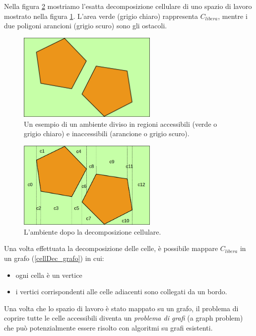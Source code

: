 \documentclass[8pt]{book}
\begin{document}
Nella figura \ref{cellDec_siDec} mostriamo l'esatta decomposizione cellulare di uno spazio di lavoro mostrato nella figura \ref{cellDec_nonDec}. L'area verde (grigio chiaro) rappresenta $C_{libera}$, mentre i due poligoni arancioni (grigio scuro) sono gli ostacoli.

\begin{figure}
  \centering
  \includegraphics[width=0.6\textwidth]{img/cellDec_nonDec.png}
  \caption{Un esempio di un ambiente diviso in regioni accessibili (verde o grigio chiaro) e inaccessibili (arancione o grigio scuro).}
\label{cellDec_nonDec}
\end{figure}

\begin{figure}
  \centering
  \includegraphics[width=0.6\textwidth]{img/cellDec_siDec.png}
  \caption{L'ambiente dopo la decomposizione cellulare.}
  \label{cellDec_siDec}
\end{figure}

Una volta effettuata la decomposizione delle celle, è possibile mappare $C_{libera}$ in un grafo (\ref{cellDec_grafo}) in cui:

\begin{itemize}
\item
  ogni cella è un vertice
\item
  i vertici corrispondenti alle celle adiacenti sono collegati da un bordo.
\end{itemize}

Una volta che lo spazio di lavoro è stato mappato su un grafo, il problema di coprire tutte le celle accessibili diventa un \emph{problema di grafi} (a graph problem) che può potenzialmente essere risolto con algoritmi su grafi esistenti.
\end{document}
